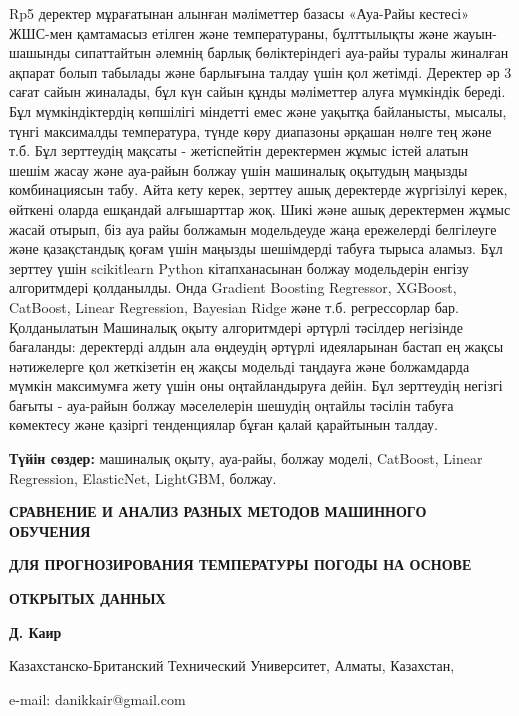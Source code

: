 Rp5 деректер мұрағатынан алынған мәліметтер базасы «Ауа-Райы кестесі»
ЖШС-мен қамтамасыз етілген және температураны, бұлттылықты және
жауын-шашынды сипаттайтын әлемнің барлық бөліктеріндегі ауа-райы туралы
жиналған ақпарат болып табылады және барлығына талдау үшін қол жетімді.
Деректер әр 3 сағат сайын жиналады, бұл күн сайын құнды мәліметтер алуға
мүмкіндік береді. Бұл мүмкіндіктердің көпшілігі міндетті емес және
уақытқа байланысты, мысалы, түнгі максималды температура, түнде көру
диапазоны әрқашан нөлге тең және т.б. Бұл зерттеудің мақсаты -
жетіспейтін деректермен жұмыс істей алатын шешім жасау және ауа-райын
болжау үшін машиналық оқытудың маңызды комбинациясын табу. Айта кету
керек, зерттеу ашық деректерде жүргізілуі керек, өйткені оларда ешқандай
алғышарттар жоқ. Шикі және ашық деректермен жұмыс жасай отырып, біз ауа
райы болжамын модельдеуде жаңа ережелерді белгілеуге және қазақстандық
қоғам үшін маңызды шешімдерді табуға тырыса аламыз. Бұл зерттеу үшін
scikitlearn Python кітапханасынан болжау модельдерін енгізу алгоритмдері
қолданылды. Онда Gradient Boosting Regressor, XGBoost, CatBoost, Linear
Regression, Bayesian Ridge және т.б. регрессорлар бар. Қолданылатын
Машиналық оқыту алгоритмдері әртүрлі тәсілдер негізінде бағаланды:
деректерді алдын ала өңдеудің әртүрлі идеяларынан бастап ең жақсы
нәтижелерге қол жеткізетін ең жақсы модельді таңдауға және болжамдарда
мүмкін максимумға жету үшін оны оңтайландыруға дейін. Бұл зерттеудің
негізгі бағыты - ауа-райын болжау мәселелерін шешудің оңтайлы тәсілін
табуға көмектесу және қазіргі тенденциялар бұған қалай қарайтынын
талдау.

\textbf{Түйін сөздер:} машиналық оқыту, ауа-райы, болжау моделі,
CatBoost, Linear Regression, ElasticNet, LightGBM, болжау.

\textbf{СРАВНЕНИЕ И АНАЛИЗ РАЗНЫХ МЕТОДОВ МАШИННОГО ОБУЧЕНИЯ}

\textbf{ДЛЯ ПРОГНОЗИРОВАНИЯ ТЕМПЕРАТУРЫ ПОГОДЫ НА ОСНОВЕ}

\textbf{ОТКРЫТЫХ ДАННЫХ}

\textbf{Д. Каир}

Казахстанско-Британский Технический Университет, Алматы, Казахстан,

e-mail: danikkair@gmail.com

